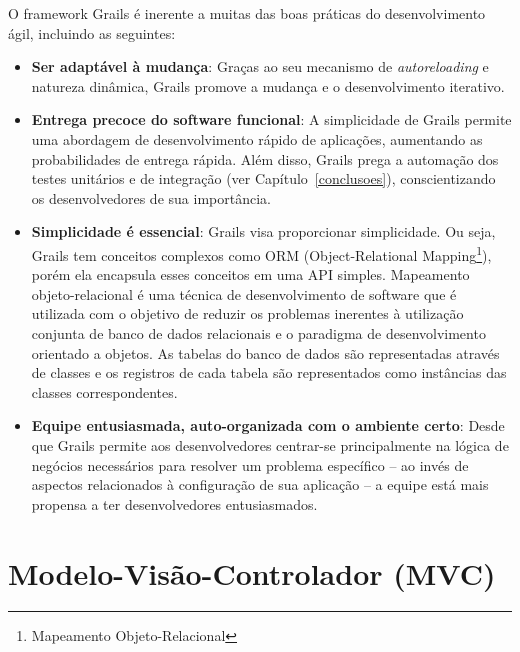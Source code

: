 O  framework Grails é  inerente a  muitas das  boas práticas  do desenvolvimento
ágil, incluindo as seguintes:

\begin{itemize}

\vspace{0.2cm}
\item  {\bf  Ser  adaptável  à   mudança}:  Graças  ao  seu  mecanismo  de  {\it
  autoreloading}   e  natureza   dinâmica,  Grails   promove  a   mudança   e  o
  desenvolvimento iterativo.

\vspace{0.2cm}
\item  {\bf Entrega  precoce do  software funcional}:  A simplicidade  de Grails
  permite uma  abordagem de desenvolvimento rápido de  aplicações, aumentando as
  probabilidades de  entrega rápida.  Além  disso, Grails prega a  automação dos
  testes   unitários   e    de   integração   (ver   Capítulo~\ref{conclusoes}),
  conscientizando os desenvolvedores de sua importância.

\vspace{0.2cm}
\item {\bf Simplicidade é  essencial}: Grails visa proporcionar simplicidade. Ou
  seja,   Grails   tem   conceitos   complexos   como   ORM   (Object-Relational
  Mapping\footnote{Mapeamento  Objeto-Relacional}),  porém  ela encapsula  esses
  conceitos em  uma API simples.  Mapeamento objeto-relacional é uma  técnica de
  desenvolvimento  de software  que é  utilizada com  o objetivo  de  reduzir os
  problemas inerentes  à utilização conjunta de  banco de dados  relacionais e o
  paradigma de desenvolvimento orientado a objetos. As tabelas do banco de dados
  são  representadas  através de  classes  e os  registros  de  cada tabela  são
  representados como instâncias das classes correspondentes.

\vspace{0.2cm}
\item {\bf Equipe entusiasmada, auto-organizada com o ambiente certo}: Desde que
  Grails  permite aos  desenvolvedores  centrar-se principalmente  na lógica  de
  negócios  necessários para  resolver um  problema  específico --  ao invés  de
  aspectos relacionados  à configuração de sua  aplicação -- a  equipe está mais
  propensa a ter desenvolvedores entusiasmados.

\end{itemize}

\section{Modelo-Visão-Controlador (MVC)}

